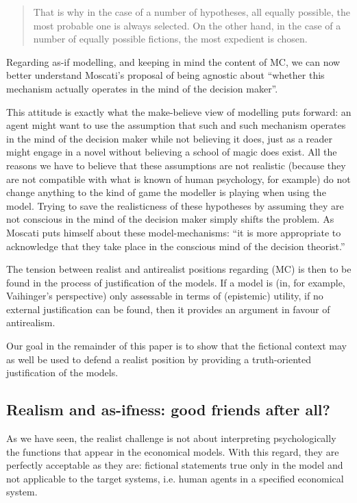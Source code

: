 \documentclass[a4paper,11pt]{article}
\theoremstyle{definition}
\begin{document}
\begin{quote}
    That is why in the case of a number of hypotheses, all equally possible, the most probable one is always selected. On the other hand, in the case of a number of equally possible fictions, the most expedient is chosen. \citep[p.~85, note 1]{Vaihinger2009}
\end{quote}

Regarding as-if modelling, and keeping in mind the content of MC, we can now better understand Moscati's proposal of being agnostic about ``whether this mechanism actually operates in the mind of the decision maker''. \citep[p.~2]{Moscati2023}

This attitude is exactly what the make-believe view of modelling puts forward: an agent might want to use the assumption that such and such mechanism operates in the mind of the decision maker while not believing it does, just as a reader might engage in a novel without believing a school of magic does exist. All the reasons we have to believe that these assumptions are not realistic (because they are not compatible with what is known of human psychology, for example) do not change anything to the kind of game the modeller is playing when using the model. Trying to save the realisticness of these hypotheses by assuming they are not conscious in the mind of the decision maker simply shifts the problem. As Moscati puts himself about these model-mechanisms: ``it is more appropriate to acknowledge that they take place in the conscious mind of the decision theorist.'' \citep[p.~12]{Moscati2023}

The tension between realist and antirealist positions regarding (MC) is then to be found in the process of justification of the models. If a model is (in, for example, Vaihinger's perspective) only assessable in terms of (epistemic) utility, if no external justification can be found, then it provides an argument in favour of antirealism.

Our goal in the remainder of this paper is to show that the fictional context may as well be used to defend a realist position by providing a truth-oriented justification of the models.


\subsection{Realism and as-ifness: good friends after all?}

As we have seen, the realist challenge is not about interpreting psychologically the functions that appear in the economical models. With this regard, they are perfectly acceptable as they are: fictional statements true only in the model and not applicable to the target systems, i.e. human agents in a specified economical system.
\end{document}
